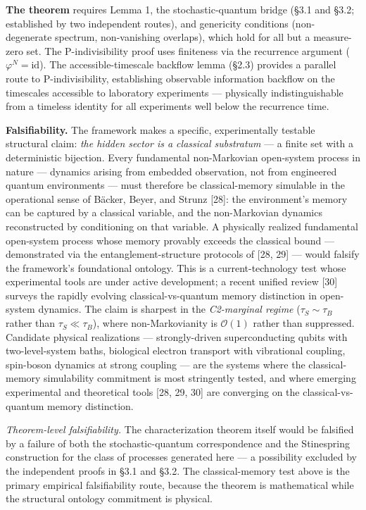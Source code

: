 \documentclass[
]{article}
\begin{document}
\textbf{The theorem} requires Lemma 1, the stochastic-quantum bridge
(§3.1 and §3.2; established by two independent routes), and genericity
conditions (non-degenerate spectrum, non-vanishing overlaps), which hold
for all but a measure-zero set. The P-indivisibility proof uses
finiteness via the recurrence argument (\(\varphi^N = \text{id}\)). The
accessible-timescale backflow lemma (§2.3) provides a parallel route to
P-indivisibility, establishing observable information backflow on the
timescales accessible to laboratory experiments --- physically
indistinguishable from a timeless identity for all experiments well
below the recurrence time.

\textbf{Falsifiability.} The framework makes a specific, experimentally
testable structural claim: \emph{the hidden sector is a classical
substratum} --- a finite set with a deterministic bijection. Every
fundamental non-Markovian open-system process in nature --- dynamics
arising from embedded observation, not from engineered quantum
environments --- must therefore be classical-memory simulable in the
operational sense of Bäcker, Beyer, and Strunz {[}28{]}: the
environment's memory can be captured by a classical variable, and the
non-Markovian dynamics reconstructed by conditioning on that variable. A
physically realized fundamental open-system process whose memory
provably exceeds the classical bound --- demonstrated via the
entanglement-structure protocols of {[}28, 29{]} --- would falsify the
framework's foundational ontology. This is a current-technology test
whose experimental tools are under active development; a recent unified
review {[}30{]} surveys the rapidly evolving classical-vs-quantum memory
distinction in open-system dynamics. The claim is sharpest in the
\emph{C2-marginal regime} (\(\tau_S \sim \tau_B\) rather than
\(\tau_S \ll \tau_B\)), where non-Markovianity is \(\mathcal{O}(1)\)
rather than suppressed. Candidate physical realizations ---
strongly-driven superconducting qubits with two-level-system baths,
biological electron transport with vibrational coupling, spin-boson
dynamics at strong coupling --- are the systems where the
classical-memory simulability commitment is most stringently tested, and
where emerging experimental and theoretical tools {[}28, 29, 30{]} are
converging on the classical-vs-quantum memory distinction.

\emph{Theorem-level falsifiability.} The characterization theorem itself
would be falsified by a failure of both the stochastic-quantum
correspondence and the Stinespring construction for the class of
processes generated here --- a possibility excluded by the independent
proofs in §3.1 and §3.2. The classical-memory test above is the primary
empirical falsifiability route, because the theorem is mathematical
while the structural ontology commitment is physical.
\end{document}
